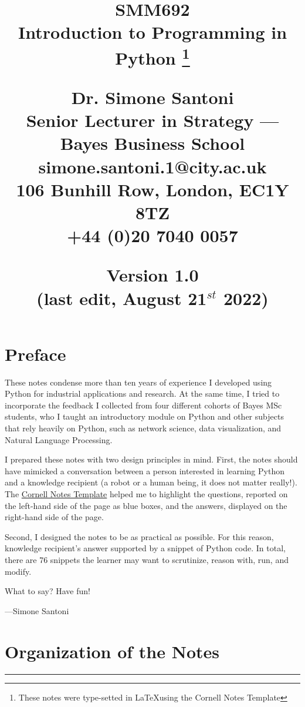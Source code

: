 \documentclass[a4paper,11pt]{book}
\title{%
        \begin{tcolorbox}[before skip = \baselineskip, after skip =-\baselineskip]
            \centering\Huge\sffamily SMM692\\ Introduction to Programming in Python
	    \footnote{These notes were type-setted in \LaTeX using the Cornell Notes Template} 
        \end{tcolorbox}

	\vspace{5em}

	\sffamily
	Dr. Simone Santoni\\ 
	Senior Lecturer in Strategy --- Bayes Business School\\
	\seticon{faAt} simone.santoni.1@city.ac.uk\\
	\seticon{faMapMarker}  106 Bunhill Row, London, EC1Y 8TZ\\
	\seticon{faPhone} +44 (0)20 7040 0057\\

	\vspace{5em}

	\normalsize Version 1.0\\ 
	(last edit, August 21$^{st}$ 2022)

}
\date{}
\numberwithin{figure}{chapter}
\numberwithin{table}{chapter}
\begin{document}
    
\maketitle  

\clearpage

\tableofcontents

\listoffigures

\listoftables

\clearpage

\chapter*{Preface}

These notes condense more  than ten years of experience I developed using Python for industrial applications and research. At the same time, I tried to incorporate the feedback I collected from four different cohorts of Bayes MSc students, who I taught an introductory module on Python and other subjects that rely heavily on Python, such as network science, data visualization, and Natural Language Processing. 

\quad I prepared these notes with two design principles in mind. First, the notes should have mimicked a conversation between a person interested in learning Python and a knowledge recipient (a robot or a human being, it does not matter really!).  The \href{https://en.wikipedia.org/wiki/Cornell_Notes}{Cornell Notes Template} helped me to highlight the questions, reported on the left-hand side of the page as blue boxes, and the answers, displayed on the right-hand side of the page.

\quad Second, I designed the notes to be as practical as possible. For this reason, knowledge recipient's answer supported by a snippet of Python code. In total, there are 76 snippets the learner may want to scrutinize, reason with, run, and modify.

\quad What to say? Have fun!

\vspace{2em}

---Simone Santoni


\chapter{Organization of the Notes}
\label{ch:organization}
\par\noindent\rule{\textwidth}{0.4pt}
\end{document}
